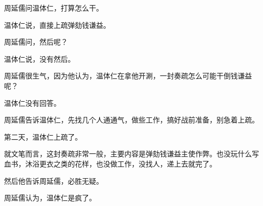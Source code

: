 \begin{multicols}{\theparacolNo}
周延儒问温体仁，打算怎么干。

温体仁说，直接上疏弹劾钱谦益。

周延儒问，然后呢？

温体仁说，没有然后。

周延儒很生气，因为他认为，温体仁在拿他开涮，一封奏疏怎么可能干倒钱谦益呢？

温体仁没有回答。

周延儒告诉温体仁，先找几个人通通气，做些工作，搞好战前准备，别急着上疏。

第二天，温体仁上疏了。

就文笔而言，这封奏疏非常一般，主要内容是弹劾钱谦益主使作弊。也没玩什么写血书，沐浴更衣之类的花样，也没做工作，没找人，递上去就完了。

然后他告诉周延儒，必胜无疑。

周延儒认为，温体仁是疯了。
\ifnum{}
	\end{multicols}
\fi
\newpage
